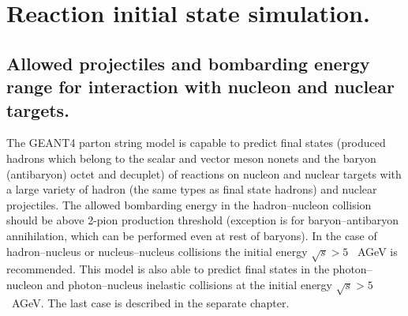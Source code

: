 \section{Reaction initial state simulation.}

\subsection{Allowed projectiles and bombarding energy range for interaction 
with nucleon and nuclear targets.}
\hspace{1.0em}
The GEANT4 parton string model is capable to predict final states (produced 
hadrons 
which belong to the scalar and vector meson nonets and the baryon (antibaryon) 
octet and decuplet) of reactions on nucleon and nuclear targets 
with a large variety of hadron (the same types as final state hadrons) and 
nuclear projectiles. The allowed bombarding energy in the hadron--nucleon 
collision should be above 2-pion production threshold (exception is for 
baryon--antibaryon annihilation, which can be performed even at rest of baryons).
In the case of hadron--nucleus or nucleus--nucleus collisions the initial
energy $\sqrt{s} > 5$ \ AGeV is recommended. This model is also able to predict
final states in the photon--nucleon and photon--nucleus inelastic 
collisions at the initial
energy $\sqrt{s} > 5$ \ AGeV. The last case is described in the 
separate chapter.
 
